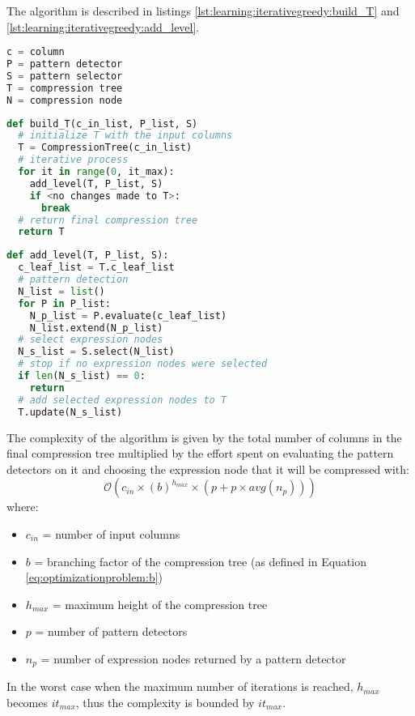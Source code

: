 The algorithm is described in listings \ref{lst:learning:iterativegreedy:build_T} and \ref{lst:learning:iterativegreedy:add_level}.

\begin{lstlisting}[language=Python,
label={lst:learning:iterativegreedy:naming},
caption={Naming conventions}]
c = column
P = pattern detector
S = pattern selector
T = compression tree
N = compression node
\end{lstlisting}

\begin{lstlisting}[language=Python,
label={lst:learning:iterativegreedy:build_T},
caption={build\_T (iterative greedy)}]
def build_T(c_in_list, P_list, S)
  # initialize T with the input columns
  T = CompressionTree(c_in_list)
  # iterative process
  for it in range(0, it_max):
    add_level(T, P_list, S)
    if <no changes made to T>:
      break
  # return final compression tree
  return T
\end{lstlisting}

\begin{lstlisting}[language=Python,
label={lst:learning:iterativegreedy:add_level},
caption={add\_level (iterative greedy)}]
def add_level(T, P_list, S):
  c_leaf_list = T.c_leaf_list
  # pattern detection 
  N_list = list()
  for P in P_list:
    N_p_list = P.evaluate(c_leaf_list)
    N_list.extend(N_p_list)
  # select expression nodes
  N_s_list = S.select(N_list)
  # stop if no expression nodes were selected
  if len(N_s_list) == 0:
    return
  # add selected expression nodes to T
  T.update(N_s_list)
\end{lstlisting}
\bigskip

The complexity of the algorithm is given by the total number of columns in the final compression tree multiplied by the effort spent on evaluating the pattern detectors on it and choosing the expression node that it will be compressed with:
\begin{equation}
\label{eq:learning:recursiveexhaustive}
    \mathcal{O}(c_{in} \times (b) ^ {h_{max}} \times (p + p \times \mathit{avg}(n_{p})))
\end{equation}
where:
\begin{itemize}
    \item[] \(c_{in}\) = number of input columns
    \item[] \(b\) = branching factor of the compression tree (as defined in Equation \ref{eq:optimizationproblem:b})
    \item[] \(h_{max}\) = maximum height of the compression tree
    \item[] \(p\) = number of pattern detectors
    \item[] \(n_{p}\) = number of expression nodes returned by a pattern detector
\end{itemize}
In the worst case when the maximum number of iterations is reached, \(h_{max}\) becomes \(it_{max}\), thus the complexity is bounded by \(it_{max}\).

